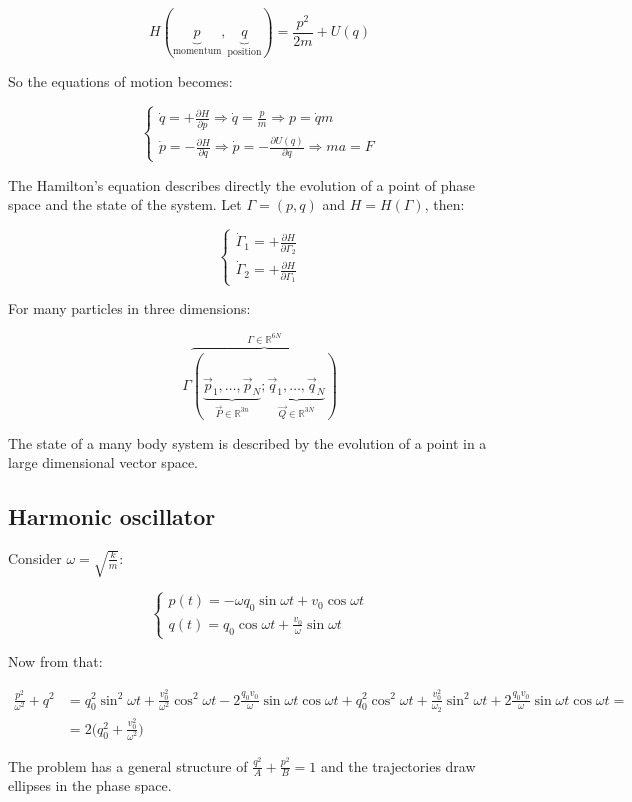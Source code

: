   $$H(\underbrace{p}_{\text{momentum}}, \underbrace{q}_{\text{position}}) = \frac{p^2}{2m} + U(q)$$

  So the equations of motion becomes:

  $$\begin{cases}
    \dot{q} = + \frac{\partial {H}}{\partial {p}}\Rightarrow \dot{q} = \frac{p}{m}\Rightarrow p = \dot{q}m\\
    \dot{p} = - \frac{\partial {H}}{\partial {q}}\Rightarrow \dot{p} = -\frac{\partial {U(q)}}{\partial {q}}\Rightarrow ma = F
  \end{cases}$$

  The Hamilton's equation describes directly the evolution of a point of phase space and the state of the system.
  Let $\Gamma = (p,q)$ and $H = H(\Gamma)$, then:

  $$\begin{cases}
    \dot{\Gamma}_1 = +\frac{\partial {H}}{\partial {\Gamma_2}}\\
    \dot{\Gamma}_2 = +\frac{\partial {H}}{\partial {\Gamma_1}}
  \end{cases}$$

  For many particles in three dimensions:

  $$\Gamma\overbrace{(\underbrace{\vec{p}_1,\dots,\vec{p}_N}_{\vec{P}\in \mathbb{R}^{3n}};\underbrace{\vec{q}_1,\dots,\vec{q}_N}_{\vec{Q}\in \mathbb{R}^{3N}})}^{\Gamma\in \mathbb{R}^{6N}}$$

  The state of a many body system is described by the evolution of a point in a large dimensional vector space.

  \subsection{Harmonic oscillator}
  Consider $\omega = \sqrt{\frac{k}{m}}$:

  $$\begin{cases}
    p(t) = -\omega q_0\sin\omega t + v_0\cos\omega t\\
    q(t) = q_0\cos\omega t + \frac{v_0}{\omega}\sin\omega t
  \end{cases}$$

  Now from that:

  \begin{align*}
    \frac{p^2}{\omega^2}+q^2 &= q_0^2\sin^2\omega t + \frac{v_0^2}{\omega^2}\cos^2\omega t - 2 \frac{q_0v_0}{\omega}\sin \omega t\cos \omega t + q_0^2\cos^2\omega t + \frac{v_0^2}{\omega_2}\sin^2\omega t + 2\frac{q_0v_0}{\omega}\sin \omega t\cos \omega t =\\
                             &=2\biggl(q_0^2+\frac{v_0^2}{\omega^2}\biggr)
  \end{align*}

  The problem has a general structure of $\frac{q^2}{A}+\frac{p^2}{B}=1$ and the trajectories draw ellipses in the phase space.
